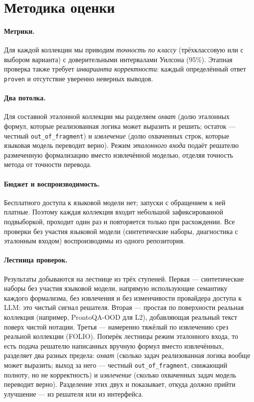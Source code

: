 \documentclass[11pt,a4paper]{article}
\begin{document}
\section{Методика оценки}
\label{sec:method}

\paragraph{Метрики.} Для каждой коллекции мы приводим \emph{точность по классу} (трёхклассовую или с выбором варианта) с
доверительными интервалами Уилсона (95\%). Этапная проверка также требует \emph{инварианта корректности}: каждый определённый
ответ \texttt{proven} и отсутствие уверенно неверных выводов.

\paragraph{Два потолка.} Для составной эталонной коллекции мы разделяем \emph{охват} (долю эталонных формул, которые
реализованная логика может выразить и решить; остаток — честный \texttt{out\_of\_fragment}) и \emph{извлечение}
(долю охваченных строк, которые языковая модель переводит верно). Режим \emph{эталонного входа} подаёт решателю размеченную
формализацию вместо извлечённой моделью, отделяя точность метода от точности перевода.

\paragraph{Бюджет и воспроизводимость.} Бесплатного доступа к языковой модели нет; запуски с обращением к ней платные.
Поэтому каждая коллекция входит небольшой зафиксированной подвыборкой, проходит один раз и повторяется только при
расхождении. Все проверки без участия языковой модели (синтетические наборы, диагностика с эталонным входом)
воспроизводимы из одного репозитория.

\paragraph{Лестница проверок.} Результаты добываются на лестнице из трёх ступеней. Первая — синтетические наборы
без участия языковой модели, напрямую использующие семантику каждого формализма, без извлечения и без изменчивости
провайдера доступа к LLM: это чистый сигнал решателя. Вторая — простая по поверхности реальная коллекция (например, ProntoQA-OOD для L2),
добавляющая реальный текст поверх чистой нотации. Третья — намеренно тяжёлый по извлечению срез реальной коллекции
(FOLIO). Поперёк лестницы режим эталонного входа, то есть подача решателю написанных вручную формул вместо извлечённых,
разделяет два разных предела: \emph{охват} (сколько задач реализованная логика вообще может выразить; выход за него
 — честный \texttt{out\_of\_fragment}, снижающий полноту, но не корректность) и \emph{извлечение} (сколько охваченных
задач модель переводит верно). Разделение этих двух и показывает, откуда должно прийти улучшение — из решателя или
из интерфейса.
\end{document}
